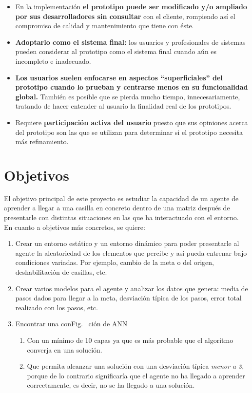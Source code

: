 \begin{itemize}
    \item En la implementación \textbf{el prototipo puede ser modificado y/o ampliado por sus desarrolladores sin consultar} con el cliente, rompiendo así el compromiso de calidad y mantenimiento que tiene con éste.
    \item \textbf{Adoptarlo como el sistema final:} los usuarios y profesionales de sistemas pueden considerar al prototipo como el sistema final cuando aún es incompleto e inadecuado.
    \item \textbf{Los usuarios suelen enfocarse en aspectos “superficiales” del prototipo cuando lo prueban y centrarse menos en su funcionalidad global.} También es posible que se pierda mucho tiempo, innecesariamente, tratando de hacer entender al usuario la finalidad real de los prototipos.
    \item Requiere \textbf{participación activa del usuario} puesto que sus opiniones acerca del prototipo son las que se utilizan para determinar si el prototipo necesita más refinamiento. 
    \end{itemize}

\section{Objetivos}

El objetivo principal de este proyecto es estudiar la capacidad de un agente de aprender a llegar a una casilla en concreto dentro de una matriz después de presentarle con distintas situaciones en las que ha interactuado con el entorno. \\

En cuanto a objetivos más concretos, se quiere:

\begin{enumerate}
    \item Crear un entorno estático y un entorno dinámico para poder presentarle al agente la aleatoriedad de los elementos que percibe y así pueda entrenar bajo condiciones variadas. Por ejemplo, cambio de la meta o del origen, deshabilitación de casillas, etc. 
    
    \item Crear varios modelos para el agente y analizar los datos que genera: media de pasos dados para llegar a la meta, desviación típica de los pasos, error total realizado con los pasos, etc. 
    
    \item Encontrar una conFig. ~ción de ANN
    \begin{enumerate}
        \item Con un mínimo de 10 capas ya que es más probable que el algoritmo converja en una solución. 
        \item Que permita alcanzar una solución con una desviación típica \textit{menor a 3}, porque de lo contrario significaría que el agente no ha llegado a aprender correctamente, es decir, no se ha llegado a una solución.  
    \end{enumerate}
\end{enumerate}


